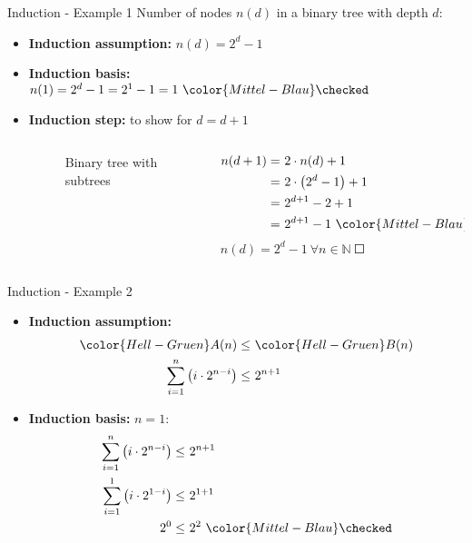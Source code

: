 \begin{frame}{Induction - Example 1}
  Number of nodes $n(d)$ in a binary tree with depth $d$:
  \begin{itemize}
    \item
      \textbf{Induction assumption:}
      $n(d) = 2^d-1$
    \item
      \textbf{Induction basis:}
      $n(1) = 2^d - 1 = 2^1 - 1 = 1 ~{\color{Mittel-Blau}\checked}$
    \item
      \textbf{Induction step:}
      to show for $d = d + 1$
      \begin{columns}
        \begin{column}{0.6\textwidth}
          \begin{figure}%
            \begin{centering}%
              \caption{Binary tree with subtrees}%
              \label{fig:binary_tree_subtrees}%
            \end{centering}%
          \end{figure}
        \end{column}
        \begin{column}{0.4\linewidth}
          \begin{align*}
          n(d + 1) = &~ 2 \cdot n(d) + 1\\
          {} = &~ 2 \cdot \left(2^d - 1\right) + 1\\
          {} = &~ 2^{d + 1} - 2 + 1\\
          {} = &~ 2^{d + 1} - 1 ~{\color{Mittel-Blau}\checked}
          \end{align*}
          $n(d) = 2^d - 1 ~\forall n \in \mathbb{N} ~\Square$
        \end{column}
      \end{columns}
  \end{itemize}
\end{frame}


\begin{frame}{Induction - Example 2}
  \begin{itemize}
    \item
      \textbf{Induction assumption:}
      \begin{align*}
        {\color{Hell-Gruen}A}(n) \leq &~ {\color{Hell-Gruen}B}(n)\\
        \sum \limits^n_{i=1} \left(i \cdot 2^{n-i} \right) \leq &~ 2^{n+1}
      \end{align*}
    \item
      \textbf{Induction basis:}
      $n = 1$:
      \begin{align*}
        \sum \limits^n_{i=1} \left(i \cdot 2^{n-i} \right) \leq &~ 2^{n+1}\\
        \sum \limits^1_{i=1} \left(i \cdot 2^{1-i} \right) \leq &~ 2^{1+1}\\
        2^0 \leq &~ 2^2 ~{\color{Mittel-Blau}\checked}
      \end{align*}
  \end{itemize}
\end{frame}

